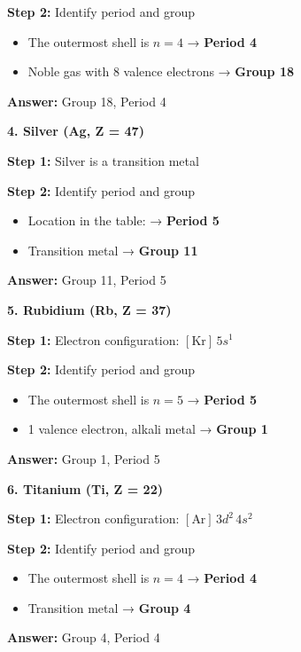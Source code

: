 \begin{exercise}
\begin{solu}
        \textbf{Step 2:} Identify period and group
        \begin{itemize}
            \item The outermost shell is \(n = 4\) → \textbf{Period 4}
            \item Noble gas with 8 valence electrons → \textbf{Group 18}
        \end{itemize}

        \textbf{Answer:} Group 18, Period 4

        \textbf{4. Silver (Ag, Z = 47)}

        \textbf{Step 1:} Silver is a transition metal

        \textbf{Step 2:} Identify period and group
        \begin{itemize}
            \item Location in the table: → \textbf{Period 5}
            \item Transition metal → \textbf{Group 11}
        \end{itemize}

        \textbf{Answer:} Group 11, Period 5

        \textbf{5. Rubidium (Rb, Z = 37)}

        \textbf{Step 1:} Electron configuration: \([\text{Kr}] \, 5s^1\)

        \textbf{Step 2:} Identify period and group
        \begin{itemize}
            \item The outermost shell is \(n = 5\) → \textbf{Period 5}
            \item 1 valence electron, alkali metal → \textbf{Group 1}
        \end{itemize}

        \textbf{Answer:} Group 1, Period 5

        \textbf{6. Titanium (Ti, Z = 22)}

        \textbf{Step 1:} Electron configuration: \([\text{Ar}] \, 3d^2 \, 4s^2\)

        \textbf{Step 2:} Identify period and group
        \begin{itemize}
            \item The outermost shell is \(n = 4\) → \textbf{Period 4}
            \item Transition metal → \textbf{Group 4}
        \end{itemize}

        \textbf{Answer:} Group 4, Period 4


\end{solu}
\end{exercise}
